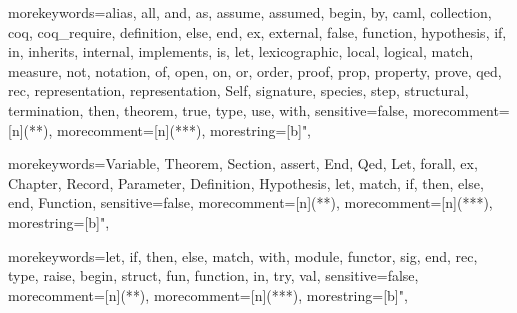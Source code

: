\newcommand{\ocaml}{{\sf OCaml}}
\newcommand{\moca}{{\sf Moca}}
\newcommand{\focal}{{\sf FoCaL}}
\newcommand{\coq}{{\sf Coq}}
\newcommand{\cime}{{\sf CiME}}
\newcommand{\latex}{{\sf LaTeX}}
\newcommand{\zenon}{{\sf Zenon}}
\newcommand{\ocamldoc}{{\sf ocamldoc}}
\newcommand{\ocamlyacc}{{\sf ocamlyacc}}
\newcommand{\ocamllex}{{\sf ocamllex}}
\newcommand{\gcc}{{\sf gcc}}
\newcommand{\focdoc}{\textsc{focdoc}}
\newcommand{\focalize}{{\sf FoCaLize}}
\newcommand{\focalizedoc}{{\sf FoCaLizeDoc}}
\newcommand{\focalizec}{{\sf focalizec}}
\newcommand{\focalizedep}{{\sf focalizedep}}
\newcommand{\decldeps}[1] {\lbag\ #1\rbag}
\newcommand{\defdeps}[1]
  {\lbag\hspace{-0.2cm}\lbag\ #1\rbag\hspace{-0.2cm}\rbag}

  {morekeywords={alias, all, and, as, assume, assumed, begin, by, caml,
      collection, coq, coq_require, definition, else, end,
      ex, external, false, function, hypothesis, if, in,
      inherits, internal, implements, is, let, lexicographic,
      local, logical, match, measure, not, notation, of, open,
      on, or, order, proof, prop, property, prove, qed, rec,
      representation, representation, Self, signature, species, step,
      structural, termination, then, theorem, true, type, use,
      with},
    sensitive=false,
    morecomment=[n]{(*}{*)},  %
    morecomment=[n]{(**}{*)},  %
    morestring=[b]",
  }

\newcommand{\setlangfocalize}{
\lstset{
  language=Focal, tabsize=2, frame=single, breaklines=true,
  basicstyle=\ttfamily, framexleftmargin=1mm, xleftmargin=1mm
}
}
\setlangfocalize


  {morekeywords={Variable, Theorem, Section, assert, End, Qed, Let,
      forall, ex, Chapter, Record, Parameter, Definition, Hypothesis,
      let, match, if, then, else, end, Function},
    sensitive=false,
    morecomment=[n]{(*}{*)},   %
    morecomment=[n]{(**}{*)},  %
    morestring=[b]",
  }

\newcommand{\setlangcoq}{
\lstset{
  language=MyCoq, tabsize=2, frame=single, breaklines=true,
  basicstyle=\ttfamily, framexleftmargin=1mm, xleftmargin=1mm
}
}



  {morekeywords={let, if, then, else, match, with, module,
      functor, sig, end, rec, type, raise, begin, struct, fun, function,
      in, try, val},
    sensitive=false,
    morecomment=[n]{(*}{*)},   %
    morecomment=[n]{(**}{*)},  %
    morestring=[b]",
  }

\newcommand{\setlangocaml}{
\lstset{
  language=MyOCaml, tabsize=2, frame=single, breaklines=true,
  basicstyle=\ttfamily, framexleftmargin=1mm, xleftmargin=1mm
}
}
